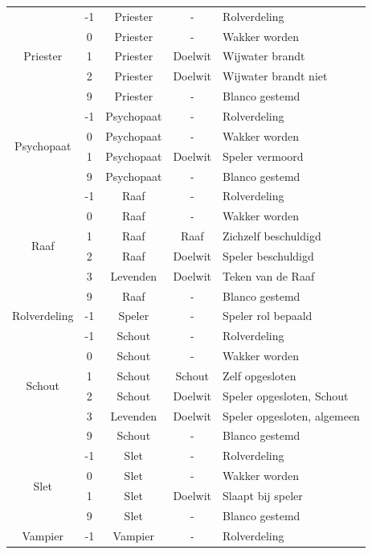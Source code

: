 \documentclass[12pt]{article}
\begin{document}
\begin{center}
\begin{longtable}{c|c|c|c|l}
      \hline
      \multirow{5}{*}{Priester} & -1 & Priester & - & Rolverdeling \\
       & 0 & Priester & - & Wakker worden \\
       & 1 & Priester & Doelwit & Wijwater brandt \\
       & 2 & Priester & Doelwit & Wijwater brandt niet \\
       & 9 & Priester & - & Blanco gestemd \\
      \hline
      \multirow{4}{*}{Psychopaat} & -1 & Psychopaat & - & Rolverdeling \\
       & 0 & Psychopaat & - & Wakker worden \\
       & 1 & Psychopaat & Doelwit & Speler vermoord \\
       & 9 & Psychopaat & - & Blanco gestemd \\
      \hline
      \multirow{6}{*}{Raaf} & -1 & Raaf & - & Rolverdeling \\
       & 0 & Raaf & - & Wakker worden \\
       & 1 & Raaf & Raaf & Zichzelf beschuldigd \\
       & 2 & Raaf & Doelwit & Speler beschuldigd \\
       & 3 & Levenden & Doelwit & Teken van de Raaf \\
       & 9 & Raaf & - & Blanco gestemd \\
      \hline
      \multirow{1}{*}{Rolverdeling} & -1 & Speler & - & Speler rol bepaald \\
      \hline
      \multirow{6}{*}{Schout} & -1 & Schout & - & Rolverdeling \\
       & 0 & Schout & - & Wakker worden \\
       & 1 & Schout & Schout & Zelf opgesloten \\
       & 2 & Schout & Doelwit & Speler opgesloten, Schout \\
       & 3 & Levenden & Doelwit & Speler opgesloten, algemeen \\
       & 9 & Schout & - & Blanco gestemd \\
      \hline
      \multirow{4}{*}{Slet} & -1 & Slet & - & Rolverdeling \\
       & 0 & Slet & - & Wakker worden \\
       & 1 & Slet & Doelwit & Slaapt bij speler \\
       & 9 & Slet & - & Blanco gestemd \\
      \hline
      \multirow{4}{*}{Vampier} & -1 & Vampier & - & Rolverdeling \\

\end{longtable}
\end{center}
\end{document}
